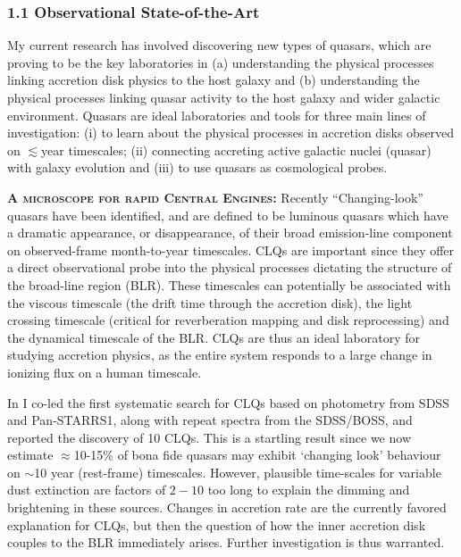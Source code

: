\subsubsection*{1.1 Observational State-of-the-Art}
\smallskip
\smallskip
\noindent
My current research has involved discovering new types of quasars,
which are proving to be the key laboratories in (a) understanding the
physical processes linking accretion disk physics to the host galaxy
and (b) understanding the physical processes linking quasar activity
to the host galaxy and wider galactic environment.  Quasars are ideal
laboratories and tools for three main lines of investigation: {\rm
(i)} to learn about the physical processes in accretion disks observed
on $\lesssim$year timescales; {\rm (ii)} connecting accreting active
galactic nuclei (quasar) with galaxy evolution and {\rm (iii)} to use
quasars as cosmological probes.

\smallskip
\smallskip
\noindent
\textbf{\textsc{A microscope for rapid Central Engines:}}
Recently ``Changing-look'' quasars 
\citep[CLQs; ][]{LaMassa2015, Runnoe2016, Ruan2016, MacLeod2016} have been
identified, and are defined to be luminous quasars which have a dramatic
appearance, or disappearance, of their broad emission-line component
on observed-frame month-to-year timescales.  CLQs are important since
they offer a direct observational probe into the physical processes
dictating the structure of the broad-line region (BLR). These
timescales can potentially be associated with the viscous timescale
(the drift time through the accretion disk), the light crossing
timescale (critical for reverberation mapping and disk reprocessing)
and the dynamical timescale of the BLR.  CLQs are thus an ideal
laboratory for studying accretion physics, as the entire system
responds to a large change in ionizing flux on a human timescale.

\smallskip \smallskip
\noindent 
In \citet{MacLeod2016}I co-led the first systematic search for CLQs based on
photometry from SDSS and Pan-STARRS1, along with repeat spectra from
the SDSS/BOSS, and reported the discovery of 10 CLQs. This is a
startling result since we now estimate $\approx$10-15\% of bona fide
quasars may exhibit `changing look' behaviour on $\sim$10 year 
(rest-frame) timescales. However, plausible time-scales for variable
dust extinction are factors of $2-10$ too long to explain the dimming
and brightening in these sources.  Changes in accretion rate are the
currently favored explanation for CLQs, but then the question of how
the inner accretion disk couples to the BLR immediately
arises. Further investigation is thus warranted.


